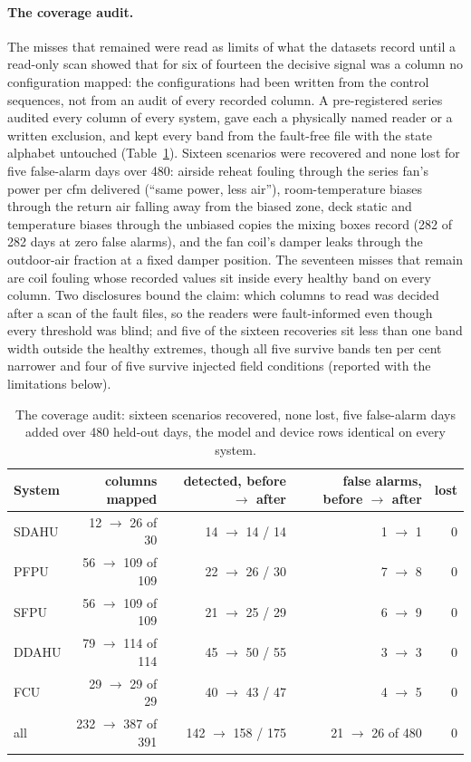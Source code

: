 \documentclass[11pt,letterpaper]{article}
\begin{document}
\paragraph{The coverage audit.} The misses that remained were read as limits of what the datasets record until a read-only scan showed that for six of fourteen the decisive signal was a column no configuration mapped: the configurations had been written from the control sequences, not from an audit of every recorded column. A pre-registered series audited every column of every system, gave each a physically named reader or a written exclusion, and kept every band from the fault-free file with the state alphabet untouched (Table~\ref{tab:coverage}). Sixteen scenarios were recovered and none lost for five false-alarm days over 480: airside reheat fouling through the series fan's power per cfm delivered (``same power, less air''), room-temperature biases through the return air falling away from the biased zone, deck static and temperature biases through the unbiased copies the mixing boxes record (282 of 282 days at zero false alarms), and the fan coil's damper leaks through the outdoor-air fraction at a fixed damper position. The seventeen misses that remain are coil fouling whose recorded values sit inside every healthy band on every column. Two disclosures bound the claim: which columns to read was decided after a scan of the fault files, so the readers were fault-informed even though every threshold was blind; and five of the sixteen recoveries sit less than one band width outside the healthy extremes, though all five survive bands ten per cent narrower and four of five survive injected field conditions (reported with the limitations below).

\begin{table}[htbp]
\centering
\caption{The coverage audit: sixteen scenarios recovered, none lost, five false-alarm days added over 480 held-out days, the model and device rows identical on every system.}
\label{tab:coverage}
\small
\begin{tabular}{@{}lrrrr@{}}
\hline
System & columns mapped & detected, before $\to$ after & false alarms, before $\to$ after & lost \\
\hline
SDAHU & 12 $\to$ 26 of 30 & 14 $\to$ 14 / 14 & 1 $\to$ 1 & 0 \\
PFPU & 56 $\to$ 109 of 109 & 22 $\to$ 26 / 30 & 7 $\to$ 8 & 0 \\
SFPU & 56 $\to$ 109 of 109 & 21 $\to$ 25 / 29 & 6 $\to$ 9 & 0 \\
DDAHU & 79 $\to$ 114 of 114 & 45 $\to$ 50 / 55 & 3 $\to$ 3 & 0 \\
FCU & 29 $\to$ 29 of 29 & 40 $\to$ 43 / 47 & 4 $\to$ 5 & 0 \\
\hline
all & 232 $\to$ 387 of 391 & 142 $\to$ 158 / 175 & 21 $\to$ 26 of 480 & 0 \\
\hline
\end{tabular}

\end{table}
\end{document}
